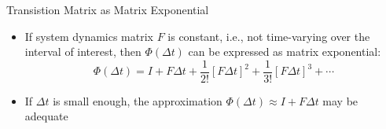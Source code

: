 \begin{frame}
\end{frame}

\begin{frame}
Transistion Matrix as Matrix Exponential
\begin{itemize}
  \item If system dynamics matrix $F$ is constant, i.e., not time-varying over the interval of interest, then $\Phi(\Delta t)$ can be expressed as matrix exponential:
\[\Phi(\Delta t) = I + F\Delta t + \dfrac{1}{2!}\left[F\Delta t\right]^2 + \dfrac{1}{3!}\left[F\Delta t\right]^3+\cdots\]
  \item If $\Delta t$ is small enough, the approximation $\Phi(\Delta t)\approx I+F\Delta t$ may be adequate
\end{itemize} 
\end{frame}


\begin{frame}
\begin{center}
\end{center}
\end{frame}

\begin{frame}
\begin{center}
\end{center}
\end{frame}
